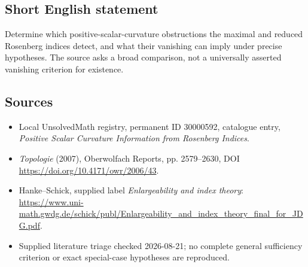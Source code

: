 \documentclass[11pt]{article}
\begin{document}
\subsection{Short English statement}
Determine which positive-scalar-curvature obstructions the maximal and reduced Rosenberg indices detect, and what their vanishing can imply under precise hypotheses. The source asks a broad comparison, not a universally asserted vanishing criterion for existence.
\subsection{Sources}
\begin{itemize}
\item Local UnsolvedMath registry, permanent ID 30000592, catalogue entry, \emph{Positive Scalar Curvature Information from Rosenberg Indices}.
\item \emph{Topologie} (2007), Oberwolfach Reports, pp. 2579--2630, DOI \url{https://doi.org/10.4171/owr/2006/43}.
\item Hanke--Schick, supplied label \emph{Enlargeability and index theory}: \url{https://www.uni-math.gwdg.de/schick/publ/Enlargeability_and_index_theory_final_for_JDG.pdf}.
\item Supplied literature triage checked 2026-08-21; no complete general sufficiency criterion or exact special-case hypotheses are reproduced.
\end{itemize}
\end{document}
